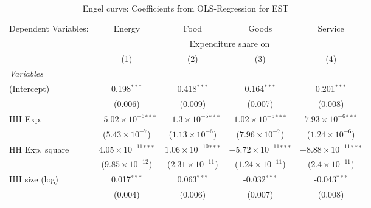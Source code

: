 
\begin{table}[htbp!]
   \centering
   \small
   \begin{adjustbox}{width = 1\textwidth, max height = 0.95\textheight, center}
      \begin{threeparttable}[b]
         \caption{\label{tab:Engel_parametric_EST} Engel curve: Coefficients from OLS-Regression for EST}
         \begin{tabular}{lcccc}
            \tabularnewline \midrule \midrule
            Dependent Variables: & Energy                         & Food                           & Goods                           & Service\\  
             & \multicolumn{4}{c}{Expenditure share on} \\ 
                                 & (1)                            & (2)                            & (3)                             & (4)\\  
            \midrule
            \emph{Variables}\\
            (Intercept)          & 0.198$^{***}$                  & 0.418$^{***}$                  & 0.164$^{***}$                   & 0.201$^{***}$\\   
                                 & (0.006)                        & (0.009)                        & (0.007)                         & (0.008)\\   
            HH Exp.              & $-5.02\times 10^{-6}$$^{***}$  & $-1.3\times 10^{-5}$$^{***}$   & $1.02\times 10^{-5}$$^{***}$    & $7.93\times 10^{-6}$$^{***}$\\    
                                 & ($5.43\times 10^{-7}$)         & ($1.13\times 10^{-6}$)         & ($7.96\times 10^{-7}$)          & ($1.24\times 10^{-6}$)\\    
            HH Exp. square       & $4.05\times 10^{-11}$$^{***}$  & $1.06\times 10^{-10}$$^{***}$  & $-5.72\times 10^{-11}$$^{***}$  & $-8.88\times 10^{-11}$$^{***}$\\    
                                 & ($9.85\times 10^{-12}$)        & ($2.31\times 10^{-11}$)        & ($1.24\times 10^{-11}$)         & ($2.4\times 10^{-11}$)\\    
            HH size (log)        & 0.017$^{***}$                  & 0.063$^{***}$                  & -0.032$^{***}$                  & -0.043$^{***}$\\   
                                 & (0.004)                        & (0.006)                        & (0.007)                         & (0.008)\\   

\end{tabular}
\end{threeparttable}
\end{adjustbox}
\end{table}
